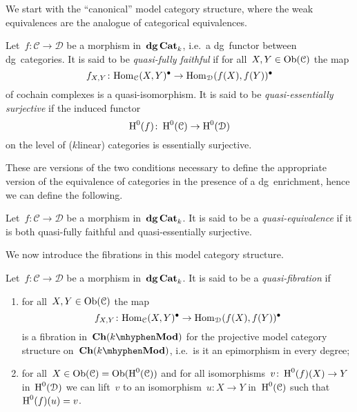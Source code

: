 \begin{refsection}
We start with the ``canonical'' model category structure, where the weak equivalences are the analogue of categorical equivalences.
\begin{definition}
  Let~$f\colon\mathcal{C}\to\mathcal{D}$ be a morphism in~$\mathbf{dg\,Cat}_k$, i.e.\ a dg~functor between dg~categories. It is said to be \emph{quasi-fully faithful} if for all~$X,Y\in\operatorname{Ob}(\mathcal{C})$ the map
  \begin{equation}
    f_{X,Y}\colon\mathrm{Hom}_{\mathcal{C}}(X,Y)^\bullet\to\mathrm{Hom}_{\mathcal{D}}(f(X),f(Y))^\bullet
  \end{equation}
  of cochain complexes is a quasi-isomorphism. It is said to be \emph{quasi-essentially surjective} if the induced functor
  \begin{equation}
    \operatorname{H}^0(f)\colon\operatorname{H}^0(\mathcal{C})\to\operatorname{H}^0(\mathcal{D})
  \end{equation}
  on the level of ($k$\dash linear) categories is essentially surjective.
\end{definition}
These are versions of the two conditions necessary to define the appropriate version of the equivalence of categories in the presence of a dg~enrichment, hence we can define the following.
\begin{definition}
  Let~$f\colon\mathcal{C}\to\mathcal{D}$ be a morphism in~$\mathbf{dg\,Cat}_k$. It is said to be a \emph{quasi-equivalence} if it is both quasi-fully faithful and quasi-essentially surjective.
\end{definition}
We now introduce the fibrations in this model category structure.
\begin{definition}
  \label{definition:quasi-fibration}
  Let~$f\colon\mathcal{C}\to\mathcal{D}$ be a morphism in~$\mathbf{dg\,Cat}_k$. It is said to be a \emph{quasi-fibration} if
  \begin{enumerate}
    \item for all~$X,Y\in\operatorname{Ob}(\mathcal{C})$ the map
      \begin{equation}
        f_{X,Y}\colon\mathrm{Hom}_{\mathcal{C}}(X,Y)^\bullet\to\mathrm{Hom}_{\mathcal{D}}(f(X),f(Y))^\bullet
      \end{equation}
      is a fibration in~$\Ch(k\mhyphen\Mod)$ for the projective model category structure on~$\Ch(k\mhyphen\Mod)$, i.e.\ is it an epimorphism in every degree;
    \item for all~$X\in\operatorname{Ob}(\mathcal{C})=\operatorname{Ob}(\operatorname{H}^0(\mathcal{C}))$ and for all isomorphisms~$v\colon\operatorname{H}^0(f)(X)\to Y$ in~$\operatorname{H}^0(\mathcal{D})$ we can lift~$v$ to an isomorphism~$u\colon X\to Y$ in~$\operatorname{H}^0(\mathcal{C})$ such that~$\operatorname{H}^0(f)(u)=v$.
  \end{enumerate}
\end{definition}


\end{refsection}
